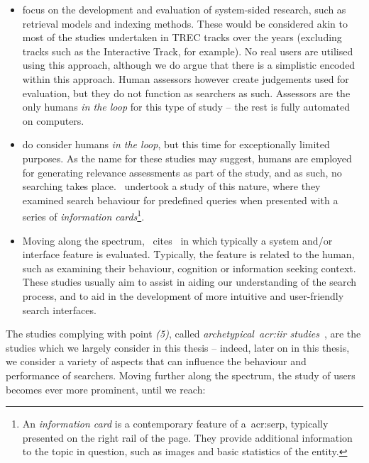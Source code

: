 \begin{itemize}
    
    \item[\emph{(1)}]{ focus on the development and evaluation of system-sided research, such as retrieval models and indexing methods. These would be considered akin to most of the studies undertaken in TREC tracks over the years (excluding tracks such as the Interactive Track, for example). No real users are utilised using this approach, although we do argue that there is a simplistic  encoded within this approach. Human assessors however create judgements used for evaluation, but they do not function as searchers as such. Assessors are the only humans \emph{in the loop} for this type of study -- the rest is fully automated on computers.}
    
    \item[\emph{(2)}]{ do consider humans \emph{in the loop}, but this time for exceptionally limited purposes. As the name for these studies may suggest, humans are employed for generating relevance assessments as part of the study, and as such, no searching takes place.~\cite{bota2016cards} undertook a study of this nature, where they examined search behaviour for predefined queries when presented with a series of \emph{information cards}\footnote{An \emph{information card} is a contemporary feature of a~\gls{acr:serp}, typically presented on the right rail of the page. They provide additional information to the topic in question, such as images and basic statistics of the entity.}}.
    
    \item[\emph{(5)}]{Moving along the spectrum,~\cite{kelly2009iir} cites~ in which typically a system and/or interface feature is evaluated. Typically, the feature is related to the human, such as examining their behaviour, cognition or information seeking context. These studies usually aim to assist in aiding our understanding of the search process, and to aid in the development of more intuitive and user-friendly search interfaces.}
    
\end{itemize}

The studies complying with point \emph{(5)}, called \emph{archetypical~\gls{acr:iir} studies}~\citep{kelly2009iir}, are the studies which we largely consider in this thesis -- indeed, later on in this thesis, we consider a variety of aspects that can influence the behaviour and performance of searchers. Moving further along the spectrum, the study of users becomes ever more prominent, until we reach:

